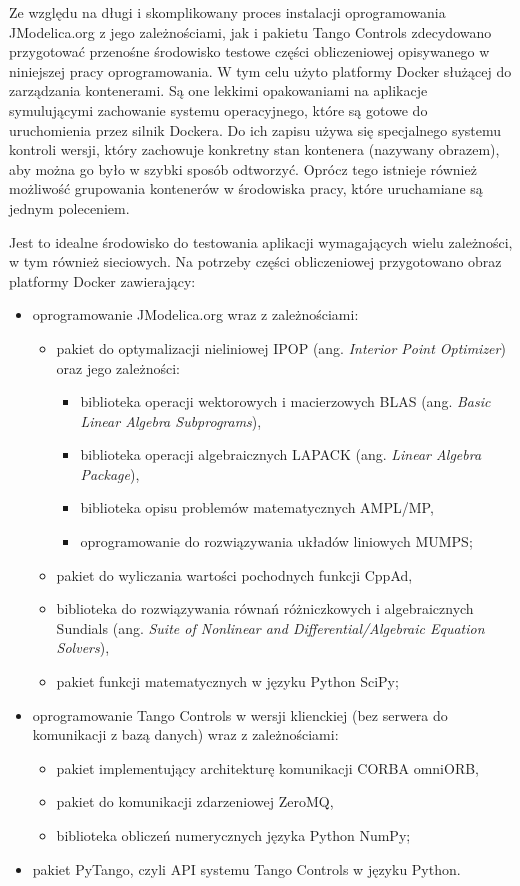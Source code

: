 Ze względu na długi i skomplikowany proces instalacji oprogramowania JModelica.org z jego zależnościami, jak i pakietu Tango Controls zdecydowano przygotować przenośne środowisko testowe części obliczeniowej opisywanego w niniejszej pracy oprogramowania. W tym celu użyto platformy Docker służącej do zarządzania kontenerami. Są one lekkimi opakowaniami na aplikacje symulującymi zachowanie systemu operacyjnego, które są gotowe do uruchomienia przez silnik Dockera. Do ich zapisu używa się specjalnego systemu kontroli wersji, który zachowuje konkretny stan kontenera (nazywany obrazem), aby można go było w szybki sposób odtworzyć.
Oprócz tego istnieje również możliwość grupowania kontenerów w środowiska pracy, które uruchamiane są jednym poleceniem.

Jest to idealne środowisko do testowania aplikacji wymagających wielu zależności, w tym również sieciowych. Na potrzeby części obliczeniowej przygotowano obraz platformy Docker zawierający:
\begin{itemize}
    \item oprogramowanie JModelica.org wraz z zależnościami:
    \begin{itemize}
        \item pakiet do optymalizacji nieliniowej IPOP (ang. \emph{Interior Point Optimizer}) oraz jego zależności:
        \begin{itemize}
            \item biblioteka operacji wektorowych i macierzowych BLAS (ang. \emph{Basic Linear Algebra Subprograms}),
            \item biblioteka operacji algebraicznych LAPACK (ang. \emph{Linear Algebra Package}),
            \item biblioteka opisu problemów matematycznych AMPL/MP,
            \item oprogramowanie do rozwiązywania układów liniowych MUMPS;
        \end{itemize}
        \item pakiet do wyliczania wartości pochodnych funkcji CppAd,
        \item biblioteka do rozwiązywania równań różniczkowych i algebraicznych Sundials (ang. \emph{Suite of Nonlinear and Differential/Algebraic Equation Solvers}),
        \item pakiet funkcji matematycznych w języku Python SciPy;
    \end{itemize}
    \item oprogramowanie Tango Controls w wersji klienckiej (bez serwera do komunikacji z bazą danych) wraz z zależnościami:
    \begin{itemize}
        \item pakiet implementujący architekturę komunikacji CORBA omniORB,
        \item pakiet do komunikacji zdarzeniowej ZeroMQ,
        \item biblioteka obliczeń numerycznych języka Python NumPy;
    \end{itemize}
    \item pakiet PyTango, czyli API systemu Tango Controls w języku Python.
\end{itemize}

